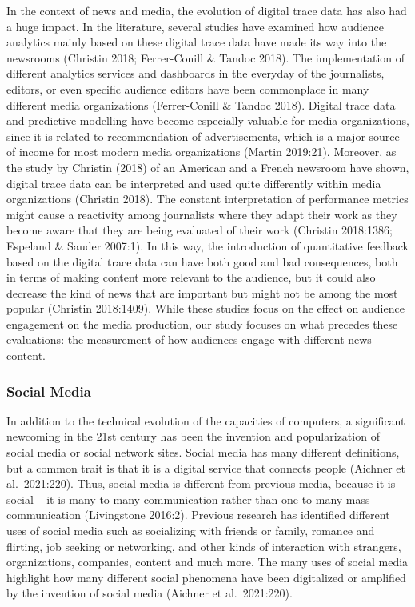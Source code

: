 \documentclass[
]{article}
\begin{document}
In the context of news and media, the evolution of digital trace data
has also had a huge impact. In the literature, several studies have
examined how audience analytics mainly based on these digital trace data
have made its way into the newsrooms (Christin 2018; Ferrer-Conill \&
Tandoc 2018). The implementation of different analytics services and
dashboards in the everyday of the journalists, editors, or even specific
audience editors have been commonplace in many different media
organizations (Ferrer-Conill \& Tandoc 2018). Digital trace data and
predictive modelling have become especially valuable for media
organizations, since it is related to recommendation of advertisements,
which is a major source of income for most modern media organizations
(Martin 2019:21). Moreover, as the study by Christin (2018) of an
American and a French newsroom have shown, digital trace data can be
interpreted and used quite differently within media organizations
(Christin 2018). The constant interpretation of performance metrics
might cause a reactivity among journalists where they adapt their work
as they become aware that they are being evaluated of their work
(Christin 2018:1386; Espeland \& Sauder 2007:1). In this way, the
introduction of quantitative feedback based on the digital trace data
can have both good and bad consequences, both in terms of making content
more relevant to the audience, but it could also decrease the kind of
news that are important but might not be among the most popular
(Christin 2018:1409). While these studies focus on the effect on
audience engagement on the media production, our study focuses on what
precedes these evaluations: the measurement of how audiences engage with
different news content.

\hypertarget{social-media}{%
\subsubsection{Social Media}\label{social-media}}

\noindent In addition to the technical evolution of the capacities of
computers, a significant newcoming in the 21st century has been the
invention and popularization of social media or social network sites.
Social media has many different definitions, but a common trait is that
it is a digital service that connects people (Aichner et al.~2021:220).
Thus, social media is different from previous media, because it is
social -- it is many-to-many communication rather than one-to-many mass
communication (Livingstone 2016:2). Previous research has identified
different uses of social media such as socializing with friends or
family, romance and flirting, job seeking or networking, and other kinds
of interaction with strangers, organizations, companies, content and
much more. The many uses of social media highlight how many different
social phenomena have been digitalized or amplified by the invention of
social media (Aichner et al.~2021:220).
\end{document}
